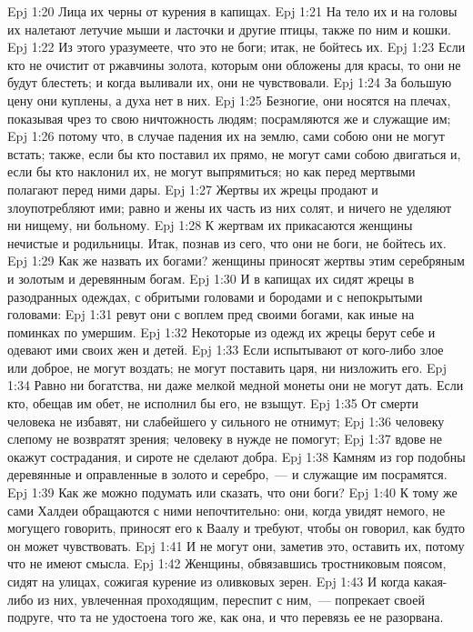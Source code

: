 \vs Epj 1:20 Лица их черны от курения в капищах.
\vs Epj 1:21 На тело их и на головы их налетают летучие мыши и ласточки и другие птицы,  также по ним и кошки.
\vs Epj 1:22 Из этого уразумеете, что это не боги; итак, не бойтесь их.
\rsbpar\vs Epj 1:23 Если кто не очистит от ржавчины золота, которым они обложены для красы, то они не будут блестеть; и когда выливали их, они не чувствовали.
\vs Epj 1:24 За большую цену они куплены, а духа нет в них.
\vs Epj 1:25 Безногие, они носятся на плечах, показывая чрез то свою ничтожность людям; посрамляются же и служащие им;
\vs Epj 1:26 потому что, в случае падения их на землю, сами собою они не могут встать; также, если бы кто поставил их прямо, не могут сами собою двигаться и, если бы кто наклонил их, не могут выпрямиться; но как перед мертвыми полагают перед ними дары.
\vs Epj 1:27 Жертвы их жрецы продают и злоупотребляют ими; равно и жены их часть из них солят, и ничего не уделяют ни нищему, ни больному.
\vs Epj 1:28 К жертвам их прикасаются женщины нечистые и родильницы. Итак, познав из сего, что они не боги, не бойтесь их.
\vs Epj 1:29 Как же назвать их богами? женщины приносят жертвы этим серебряным и золотым и деревянным богам.
\vs Epj 1:30 И в капищах их сидят жрецы в разодранных одеждах, с обритыми головами и бородами и с непокрытыми головами:
\vs Epj 1:31 ревут они с воплем пред своими богами, как иные на поминках по умершим.
\vs Epj 1:32 Некоторые из одежд их жрецы берут себе и одевают ими своих жен и детей.
\vs Epj 1:33 Если испытывают от кого-либо злое или доброе, не могут воздать; не могут поставить царя, ни низложить его.
\vs Epj 1:34 Равно ни богатства, ни даже мелкой медной монеты они не могут дать. Если кто, обещав им обет, не исполнил бы его, не взыщут.
\vs Epj 1:35 От смерти человека не избавят, ни слабейшего у сильного не отнимут;
\vs Epj 1:36 человеку слепому не возвратят зрения; человеку в нужде не помогут;
\vs Epj 1:37 вдове не окажут сострадания, и сироте не сделают добра.
\vs Epj 1:38 Камням из гор подобны  деревянные и оправленные в золото и серебро,~--- и служащие им посрамятся.
\vs Epj 1:39 Как же можно подумать или сказать, что они боги?
\vs Epj 1:40 К тому же сами Халдеи обращаются с ними непочтительно: они, когда увидят немого, не могущего говорить, приносят его к Ваалу и требуют, чтобы он говорил, как будто он может чувствовать.
\vs Epj 1:41 И не могут они, заметив это, оставить их, потому что не имеют смысла.
\vs Epj 1:42 Женщины, обвязавшись тростниковым поясом, сидят на улицах, сожигая курение из оливковых зерен.
\vs Epj 1:43 И когда какая-либо из них, увлеченная проходящим, переспит с ним,~--- попрекает своей подруге, что та не удостоена того же, как она, и что перевязь ее не разорвана.
